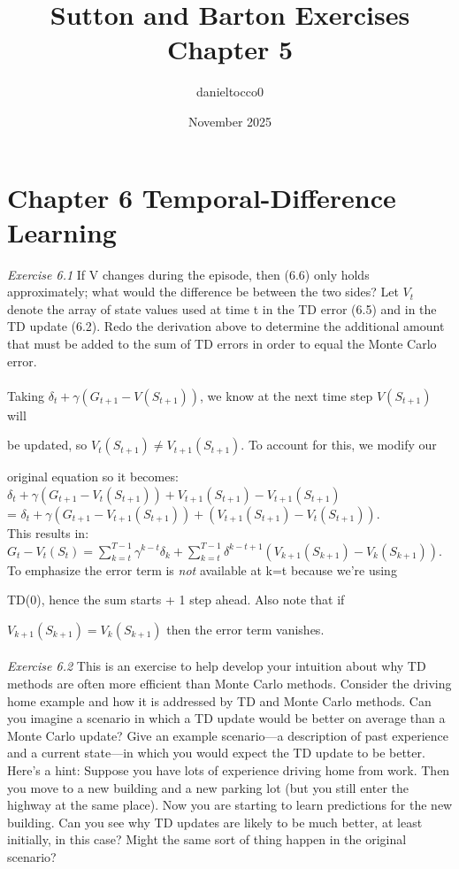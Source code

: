 \documentclass{article}
\title{Sutton and Barton Exercises Chapter 5}
\author{danieltocco0 }
\date{November 2025}
\begin{document}
\maketitle

\section{Chapter 6 Temporal-Difference Learning}
\textit{Exercise 6.1} If V changes during the episode, then (6.6) only holds approximately; what
would the difference be between the two sides? Let $V_{t}$ denote the array of state values
used at time t in the TD error (6.5) and in the TD update (6.2). Redo the derivation
above to determine the additional amount that must be added to the sum of TD errors
in order to equal the Monte Carlo error.
\\
\\

Taking $\delta_{t} + \gamma(G_{t+1} - V(S_{t+1}))$, we know at the next time step $V(S_{t+1})$ will 

be updated, so $V_{t}(S_{t+1}) \neq V_{t+1}(S_{t+1})$. To account for this, we modify our 

original equation so it becomes: \\

$\delta_{t} + \gamma(G_{t+1} - V_{t}(S_{t+1})) + V_{t+1}(S_{t+1}) - V_{t+1}(S_{t+1})$ \\

= $\delta_{t} + \gamma(G_{t+1} - V_{t+1}(S_{t+1})) + (V_{t+1}(S_{t+1}) - V_{t}(S_{t+1}))$.\\

This results in: \\

$G_{t} - V_{t}(S_{t}) = \sum_{k=t}^{T-1}\gamma^{k-t}\delta_{k} + \sum_{k=t}^{T-1} \delta^{k-t+1}(V_{k+1}(S_{k+1}) - V_{k}(S_{k+1}))$. \\

To emphasize the error term is \textit{not} available at k=t because we're using 

TD(0), hence the sum starts + 1 step ahead. Also note that if 

$V_{k+1}(S_{k+1}) = V_{k}(S_{k+1})$ then the error term vanishes.
\\\\
\textit{Exercise 6.2} This is an exercise to help develop your intuition about why TD methods
are often more efficient than Monte Carlo methods. Consider the driving home example
and how it is addressed by TD and Monte Carlo methods. Can you imagine a scenario
in which a TD update would be better on average than a Monte Carlo update? Give
an example scenario—a description of past experience and a current state—in which
you would expect the TD update to be better. Here’s a hint: Suppose you have lots of
experience driving home from work. Then you move to a new building and a new parking
lot (but you still enter the highway at the same place). Now you are starting to learn
predictions for the new building. Can you see why TD updates are likely to be much
better, at least initially, in this case? Might the same sort of thing happen in the original
scenario? 
\\
\\
\end{document}
